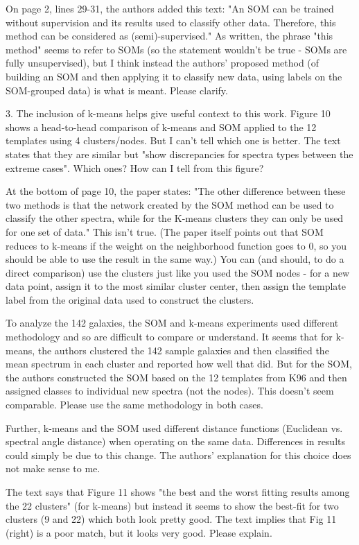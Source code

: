 On page 2, lines 29-31, the authors added this text: "An SOM can be trained without supervision and its results used to classify other data. Therefore, this method can be considered as (semi)-supervised." As written, the phrase "this method" seems to refer to SOMs (so the statement wouldn't be true - SOMs are fully unsupervised), but I think instead the authors' proposed method (of building an SOM and then applying it to classify new data, using labels on the SOM-grouped data) is what is meant.  Please clarify.

3. The inclusion of k-means helps give useful context to this work. Figure 10 shows a head-to-head comparison of k-means and SOM applied to the 12 templates using 4 clusters/nodes.  But I can't tell which one is better.  The text states that they are similar but "show discrepancies for spectra types between the extreme cases".  Which ones?  How can I tell from this figure?

At the bottom of page 10, the paper states: "The other difference between these two methods is that the network created by the SOM method can be used to classify the other spectra, while for the K-means clusters they can only be used for one set of data."  This isn't true.  (The paper itself points out that SOM reduces to k-means if the weight on the neighborhood function goes to 0, so you should be able to use the result in the same way.)  You can (and should, to do a direct comparison) use the clusters just like you used the SOM nodes - for a new data point, assign it to the most similar cluster center, then assign the template label from the original data used to construct the clusters.

To analyze the 142 galaxies, the SOM and k-means experiments used different methodology and so are difficult to compare or understand. It seems that for k-means, the authors clustered the 142 sample galaxies and then classified the mean spectrum in each cluster and reported how well that did.  But for the SOM, the authors constructed the SOM based on the 12 templates from K96 and then assigned classes to individual new spectra (not the nodes).  This doesn't seem comparable.  Please use the same methodology in both cases.

Further, k-means and the SOM used different distance functions (Euclidean vs. spectral angle distance) when operating on the same data.  Differences in results could simply be due to this change.  The authors' explanation for this choice does not make sense to me.

The text says that Figure 11 shows "the best and the worst fitting results among the 22 clusters" (for k-means) but instead it seems to show the best-fit for two clusters (9 and 22) which both look pretty good.  The text implies that Fig 11 (right) is a poor match, but it looks very good.  Please explain.

